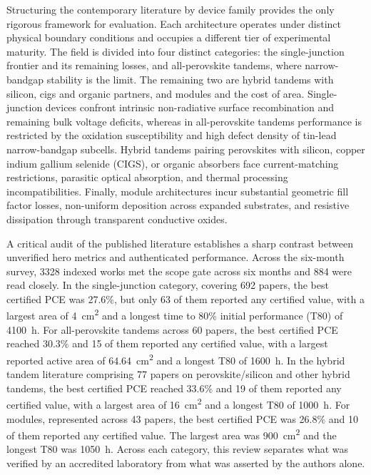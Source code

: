 \documentclass[
  11pt,
]{article}
\begin{document}
Structuring the contemporary literature by device family provides the
only rigorous framework for evaluation. Each architecture operates under
distinct physical boundary conditions and occupies a different tier of
experimental maturity. The field is divided into four distinct
categories: the single-junction frontier and its remaining losses, and
all-perovskite tandems, where narrow-bandgap stability is the limit. The
remaining two are hybrid tandems with silicon, cigs and organic
partners, and modules and the cost of area. Single-junction devices
confront intrinsic non-radiative surface recombination and remaining
bulk voltage deficits, whereas in all-perovskite tandems performance is
restricted by the oxidation susceptibility and high defect density of
tin-lead narrow-bandgap subcells. Hybrid tandems pairing perovskites
with silicon, copper indium gallium selenide (CIGS), or organic
absorbers face current-matching restrictions, parasitic optical
absorption, and thermal processing incompatibilities. Finally, module
architectures incur substantial geometric fill factor losses,
non-uniform deposition across expanded substrates, and resistive
dissipation through transparent conductive oxides.

A critical audit of the published literature establishes a sharp
contrast between unverified hero metrics and authenticated performance.
Across the six-month survey, 3328 indexed works met the scope gate
across six months and 884 were read closely. In the single-junction
category, covering 692 papers, the best certified PCE was 27.6\%, but
only 63 of them reported any certified value, with a largest area of
\qty{4}{\centi\meter\squared} and a longest time to 80\% initial
performance (T80) of \qty{4100}{\hour}. For all-perovskite tandems
across 60 papers, the best certified PCE reached 30.3\% and 15 of them
reported any certified value, with a largest reported active area of
\qty{64.64}{\centi\meter\squared} and a longest T80 of
\qty{1600}{\hour}. In the hybrid tandem literature comprising 77 papers
on perovskite/silicon and other hybrid tandems, the best certified PCE
reached 33.6\% and 19 of them reported any certified value, with a
largest area of \qty{16}{\centi\meter\squared} and a longest T80 of
\qty{1000}{\hour}. For modules, represented across 43 papers, the best
certified PCE was 26.8\% and 10 of them reported any certified value.
The largest area was \qty{900}{\centi\meter\squared} and the longest T80
was \qty{1050}{\hour}. Across each category, this review separates what
was verified by an accredited laboratory from what was asserted by the
authors alone.
\end{document}
